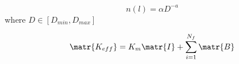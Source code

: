 \begin{equation}
\label{eqn:powerlaw}
n(l)=\alpha D^{-a}
\end{equation}
where $D \in [D_{min},D_{max}]$


\begin{equation}
\label{eqn:EMT}
\matr{K_{eff}}=K_m\matr{I}+\sum_{i=1}^{N_f} \matr{B}
\end{equation}